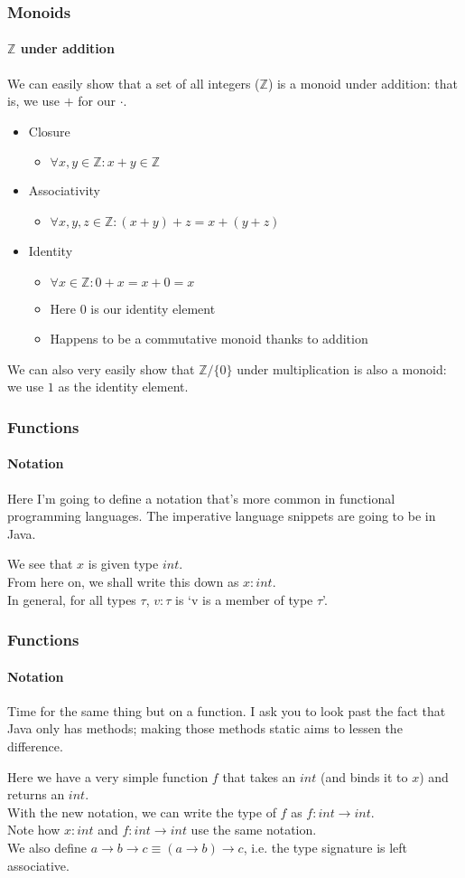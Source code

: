 \documentclass{beamer}
\begin{document}
\begin{frame}
  \frametitle{Monoids}
  \framesubtitle{$\mathbb{Z}$ under addition}
  We can easily show that a set of all integers ($\mathbb{Z}$) is a monoid
  under addition: that is, we use $+$ for our $\cdot$.
  \pause
  \begin{itemize}[<+->]
    \item Closure
      \begin{itemize}
        \item $\forall x,y \in \mathbb{Z} : x + y \in \mathbb{Z}$
      \end{itemize}
    \item Associativity
      \begin{itemize}
        \item $\forall x,y,z \in \mathbb{Z} : (x + y) + z = x + (y + z)$
      \end{itemize}
    \item Identity
      \begin{itemize}
        \item $\forall x \in \mathbb{Z} : 0 + x = x + 0 = x$
        \item Here $0$ is our identity element
        \item Happens to be a commutative monoid thanks to addition
      \end{itemize}
  \end{itemize}
  \pause
  We can also very easily show that $\mathbb{Z} / \{0\}$ under multiplication is
  also a monoid: we use $1$ as the identity element.
\end{frame}
\begin{frame}
  \frametitle{Functions}
  \framesubtitle{Notation}
  Here I'm going to define a notation that's more common in functional
  programming languages. The imperative language snippets are going to
  be in Java.\\
  \pause
  
  \pause
  We see that $x$ is given type $int$.\\
  From here on, we shall write this down as $x:int$.\\
  \pause
  In general, for all types $\tau$, $v:\tau$ is `v is a member of type $\tau$'.
\end{frame}
\begin{frame}
  \frametitle{Functions}
  \framesubtitle{Notation}
  Time for the same thing but on a function. I ask you to look past
  the fact that Java only has methods; making those methods static
  aims to lessen the difference.
  \pause
  
  \pause
  Here we have a very simple function $f$ that takes an $int$ (and binds it to
  $x$) and returns an $int$.\\
  \pause
  With the new notation, we can write the type of $f$ as $f:int
  \rightarrow int$.\\
  \pause
  Note how $x:int$ and $f:int \rightarrow int$ use the same notation.\\
  \pause
  We also define $a \rightarrow b \rightarrow c \equiv (a
  \rightarrow b) \rightarrow c$, i.e. the type signature is left associative.
\end{frame}
\end{document}
